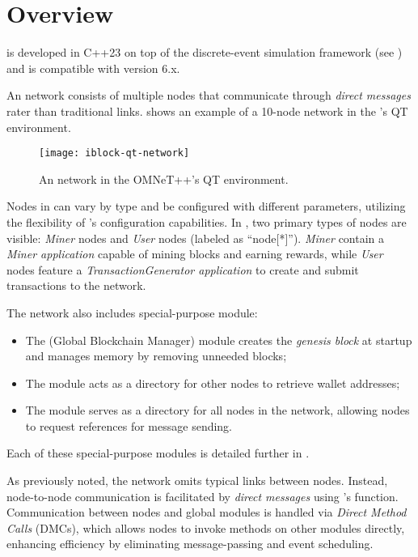 \section{Overview}\label{sec:impl-overview}

\iblock{} is developed in C++23 on top of the \omnetpp{} discrete-event
simulation framework (see ) and is compatible with
\omnetpp{} version 6.x.

An \iblock{} network consists of multiple nodes that communicate through
\emph{direct messages} rater than traditional \omnetpp{} links.
 shows an example of a 10-node network in the
\omnetpp{}'s QT environment.

\begin{figure}[tbhp]
	\centering
	\texttt{[image: iblock-qt-network]}
	\caption{An \iblock{} network in the OMNeT++'s QT
	environment.}\label{fig:iblock-network}
\end{figure}

Nodes in \iblock{} can vary by type and be configured with different
parameters, utilizing the flexibility of \omnetpp{}'s configuration
capabilities. In , two primary types of nodes
are visible: \emph{Miner} nodes and \emph{User} nodes (labeled as ``node[*]'').
\emph{Miner} contain a \emph{Miner application} capable of mining blocks and
earning rewards, while \emph{User} nodes feature a \emph{TransactionGenerator
application} to create and submit transactions to the network.

The network also includes special-purpose module:
\begin{itemize}
	\item The  (Global Blockchain Manager) module creates the
		\emph{genesis block} at startup and manages memory by removing
		unneeded blocks;
	\item The  module acts as a directory for other
		nodes to retrieve wallet addresses;
	\item The  module serves as a directory for all nodes
		in the network, allowing nodes to request references for
		message sending.
\end{itemize}

Each of these special-purpose modules is detailed further in
.

As previously noted, the network omits typical links between nodes. Instead,
node-to-node communication is facilitated by \emph{direct messages} using
\omnetpp{}'s  function. Communication between nodes and
global modules is handled via \emph{Direct Method Calls} (DMCs), which allows
nodes to invoke methods on other modules directly, enhancing efficiency by
eliminating message-passing and event scheduling.

